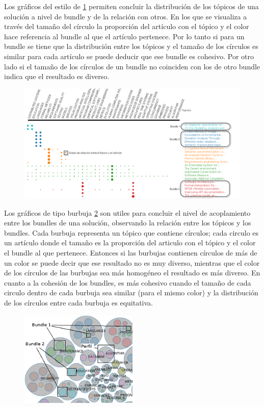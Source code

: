Los gráficos del estilo de \ref{res:img-explain-bars} permiten concluir la distribución de los tópicos de una solución a nivel de bundle y de la relación con otros. En los que se visualiza a través del tamaño del círculo la proporción del artículo con el tópico y el color hace referencia al bundle al que el artículo pertenece. Por lo tanto si para un bundle se tiene que la distribución entre los tópicos y el tamaño de los círculos es similar para cada artículo se puede deducir que ese bundle es cohesivo. Por otro lado si el tamaño de los círculos de un bundle no coinciden con los de otro bundle indica que el resultado es diverso.
\begin{figure}[H]
  \centering
    \includegraphics[width=1\textwidth]{img/explain-bars.png}
  \caption{}
  \label{res:img-explain-bars}
\end{figure}

Los gráficos de tipo burbuja \ref{res:img-explain-bubbles} son utiles para concluir el nivel de acoplamiento entre los bundles de una solución, observando la relación entre los tópicos y los bundles. Cada burbuja representa un tópico que contiene círculos; cada circulo es un artículo donde el tamaño es la proporción del articulo con el tópico y el color el bundle al que pertenece. Entonces si las burbujas contienen círculos de más de un color se puede decir que ese resultado no es muy diverso, mientras que el color de los círculos de las burbujas sea más homogéneo el resultado es más diverso. En cuanto a la cohesión de los bundles, es más cohesivo cuando el tamaño de cada circulo dentro de cada burbuja sea similar (para el mismo color) y la distribución de los círculos entre cada burbuja es equitativa.

\begin{figure}[H]
  \centering
    \includegraphics[width=0.5\textwidth]{img/explain-bubbles.png}
  \caption{}
  \label{res:img-explain-bubbles}
\end{figure}




